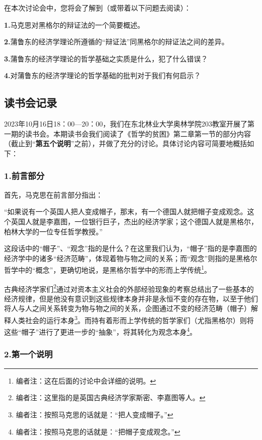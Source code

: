 \documentclass[a4paper,twoside,12pt,AutoFakeBold]{ctexart}
\begin{document}
在本次讨论会中，您将会了解到（或带着以下问题去阅读）：

\textbf{1.}马克思对黑格尔的辩证法的一个简要概述。

\textbf{2.}蒲鲁东的经济学理论所遵循的“辩证法”同黑格尔的辩证法之间的差异。

\textbf{3.}蒲鲁东的经济学理论的哲学基础之实质是什么，犯了什么错误？

\textbf{4.}对蒲鲁东的经济学理论的哲学基础的批判对于我们有何启示？

\subsection{读书会记录}
2023年10月16日18：00—20：00，我们在东北林业大学奥林学院203教室开展了第一期的读书会。本期读书会我们阅读了《哲学的贫困》第二章第一节的部分内容（截止到“\textbf{第五个说明}”之前），并做了充分的讨论。具体讨论内容可简要地概括如下：

\subsubsection{1.前言部分}\label{sec:3}

首先，马克思在前言部分指出：
\begin{adjustwidth}{2em}{2em}
\qquad\fangsong
“如果说有一个英国人把人变成帽子，那末，有一个德国人就把帽子变成观念。这个英国人就是李嘉图，一位银行巨子，杰出的经济学家；这个德国人就是黑格尔，柏林大学的一位专任哲学教授。”
\end{adjustwidth}

这段话中的“帽子”、“观念”指的是什么？在这里我们认为，“帽子”指的是李嘉图的经济学中的诸多“经济范畴”，体现着物与物之间的关系；而“观念”则指的是黑格尔哲学中的“概念”，更确切地说，是黑格尔哲学中的形而上学传统\footnote{编者注：这在后面的讨论中会详细的说明。}。

古典经济学家们\footnote{编者注：这里指的是英国古典经济学家斯密、李嘉图等人。}通过对资本主义社会的外部经验现象的考察总结出了一些基本的经济规律，但是他没有意识到这些规律本身并非是永恒不变的存在物，以至于他们将人与人之间关系转变为物与物之间的关系，企图通过不变的经济范畴（帽子）解释人类社会的运行本身\footnote{编者注：按照马克思的话就是：“把人变成帽子。”}。而持有着形而上学传统的哲学家们（尤指黑格尔）则将这些“帽子”进行了更进一步的“抽象”，将其转化为观念本身\footnote{编者注：按照马克思的话就是：“把帽子变成观念。”}。

\subsubsection{2.第一个说明}
\end{document}
